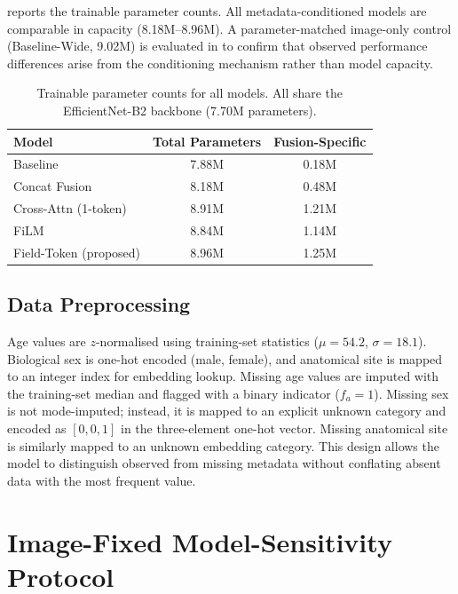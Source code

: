\documentclass[12pt, a4paper]{article}
\begin{document}
 reports the trainable parameter counts. All metadata-conditioned models are comparable in capacity (8.18M--8.96M). A parameter-matched image-only control (Baseline-Wide, 9.02M) is evaluated in  to confirm that observed performance differences arise from the conditioning mechanism rather than model capacity.

\begin{table}[htbp]
\centering
\caption{Trainable parameter counts for all models. All share the EfficientNet-B2 backbone (7.70M parameters).}
\label{tab:params}
\begin{tabular}{lcc}
\toprule
Model & Total Parameters & Fusion-Specific \\
\midrule
Baseline & 7.88M & 0.18M \\
Concat Fusion & 8.18M & 0.48M \\
Cross-Attn (1-token) & 8.91M & 1.21M \\
FiLM & 8.84M & 1.14M \\
Field-Token (proposed) & 8.96M & 1.25M \\
\bottomrule
\end{tabular}
\end{table}

\subsection{Data Preprocessing}

Age values are $z$-normalised using training-set statistics ($\mu = 54.2$, $\sigma = 18.1$). Biological sex is one-hot encoded (male, female), and anatomical site is mapped to an integer index for embedding lookup. Missing age values are imputed with the training-set median and flagged with a binary indicator ($f_a = 1$). Missing sex is not mode-imputed; instead, it is mapped to an explicit unknown category and encoded as $[0, 0, 1]$ in the three-element one-hot vector. Missing anatomical site is similarly mapped to an unknown embedding category. This design allows the model to distinguish observed from missing metadata without conflating absent data with the most frequent value.

\section{Image-Fixed Model-Sensitivity Protocol}
\label{sec:counterfactual}
\end{document}
